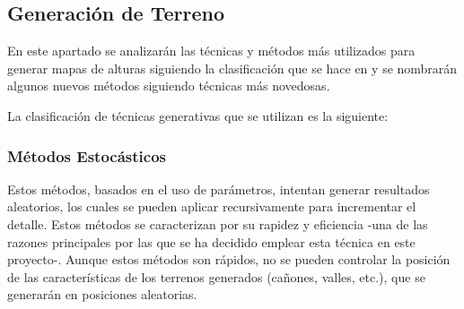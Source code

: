     
    \subsection{Generación de Terreno}
       
        En este apartado se analizarán las técnicas y métodos más utilizados para generar mapas de alturas siguiendo la clasificación que se hace en \cite{Valencia-Rosado2019} y se nombrarán algunos nuevos métodos siguiendo técnicas más novedosas.

        La clasificación de técnicas generativas que se utilizan es la siguiente:

        \subsubsection{Métodos Estocásticos}
        Estos métodos, basados en el uso de parámetros, intentan generar resultados aleatorios, los cuales se pueden aplicar recursivamente para incrementar el detalle. Estos métodos se caracterizan por su rapidez y eficiencia -una de las razones principales por las que se ha decidido emplear esta técnica en este proyecto-. Aunque estos métodos son rápidos, no se pueden controlar la posición de las características de los terrenos generados (cañones, valles, etc.), que se generarán en posiciones aleatorias.
